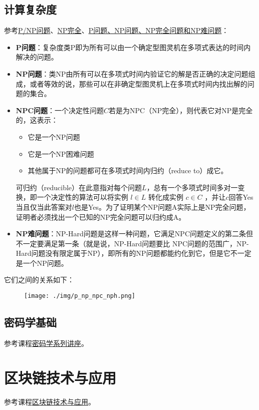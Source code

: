 \documentclass[10pt]{ctexart}
\begin{document}
\subsection{计算复杂度}
参考\href{https://zh.wikipedia.org/wiki/P/NP%E9%97%AE%E9%A2%98}{P/NP问题}、\href{https://zh.wikipedia.org/wiki/NP%E5%AE%8C%E5%85%A8}{NP完全}、\href{https://zhuanlan.zhihu.com/p/73953567}{P问题、NP问题、NP完全问题和NP难问题}：
\begin{itemize}
	\item \textbf{P问题}：复杂度类P即为所有可以由一个确定型图灵机在多项式表达的时间内解决的问题。
	\item \textbf{NP问题}：类NP由所有可以在多项式时间内验证它的解是否正确的决定问题组成，或者等效的说，那些可以在非确定型图灵机上在多项式时间内找出解的问题的集合。
	\item \textbf{NPC问题}：一个决定性问题$C$若是为NPC（NP完全），则代表它对NP是完全的，这表示：
	\begin{itemize}
		\item 它是一个NP问题
		\item 它是一个NP困难问题
		\item 其他属于NP的问题都可在多项式时间内归约（reduce to）成它。
	\end{itemize}
	可归约（reducible）在此意指对每个问题$L$，总有一个多项式时间多对一变换，即一个决定性的算法可以将实例 $l \in L$ 转化成实例 $c \in C$ ，并让$c$回答Yes当且仅当此答案对$l$也是Yes。为了证明某个NP问题A实际上是NP完全问题，证明者必须找出一个已知的NP完全问题可以归约成A。

	\item \textbf{NP难问题}：NP-Hard问题是这样一种问题，它满足NPC问题定义的第二条但不一定要满足第一条（就是说，NP-Hard问题要比 NPC问题的范围广，NP-Hard问题没有限定属于NP），即所有的NP问题都能约化到它，但是它不一定是一个NP问题。
\end{itemize}
它们之间的关系如下：
\begin{figure}[H]
    \centering
    \texttt{[image: ./img/p\_np\_npc\_nph.png]} 
\end{figure}
\subsection{密码学基础}
参考课程\href{https://www.bilibili.com/video/BV18T411k74f/?spm_id_from=333.788&vd_source=c6586ed2410fae637f393017e00f4845}{密码学系列讲座}。
\section{区块链技术与应用}
参考课程\href{http://zhenxiao.com/blockchain/}{区块链技术与应用}。
\end{document}
